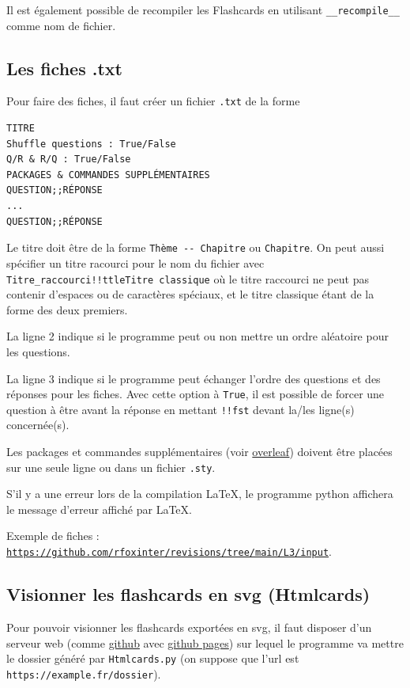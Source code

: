 \documentclass[a4paper,12pt]{article}
\begin{document}
Il est également possible de recompiler les Flashcards en utilisant \texttt{\_\_recompile\_\_} comme nom de fichier.
\subsection{Les fiches .txt}
Pour faire des fiches, il faut créer un fichier \texttt{.txt} de la forme
\vspace{-\abovedisplayskip}\begin{verbatim}
TITRE
Shuffle questions : True/False
Q/R & R/Q : True/False
PACKAGES & COMMANDES SUPPLÉMENTAIRES
QUESTION;;RÉPONSE
...
QUESTION;;RÉPONSE
\end{verbatim}
\vspace{-\belowdisplayskip}

Le titre doit être de la forme \texttt{Thème -{}- Chapitre} ou \texttt{Chapitre}.
On peut aussi spécifier un titre racourci pour le nom du fichier avec \texttt{Titre\_raccourci!!ttleTitre classique} où le titre raccourci ne peut pas contenir d'espaces ou de caractères spéciaux, et le titre classique étant de la forme des deux premiers.

La ligne 2 indique si le programme peut ou non mettre un ordre aléatoire pour les questions.

La ligne 3 indique si le programme peut échanger l'ordre des questions et des réponses pour les fiches. Avec cette option à \texttt{True}, il est possible de forcer une question à être avant la réponse en mettant \texttt{!!fst} devant la/les ligne(s) concernée(s).

Les packages et commandes supplémentaires (voir \href{https://www.overleaf.com/learn/latex/Commands}{overleaf}) doivent être placées sur une seule ligne ou dans un fichier \texttt{.sty}.

S'il y a une erreur lors de la compilation \LaTeX, le programme python affichera le message d'erreur affiché par \LaTeX.

Exemple de fiches : \href{https://github.com/rfoxinter/revisions/tree/main/L3/input}{\texttt{https://github.com/rfoxinter/revisions/tree/main/L3/input}}.
\subsection{Visionner les flashcards en svg (Htmlcards)}
Pour pouvoir visionner les flashcards exportées en svg, il faut disposer d'un serveur web (comme \href{https://github.com/}{github} avec \href{https://pages.github.com/}{github pages}) sur lequel le programme va mettre le dossier généré par \texttt{Htmlcards.py} (on suppose que l'url est \texttt{https://example.fr/dossier}).
\end{document}

